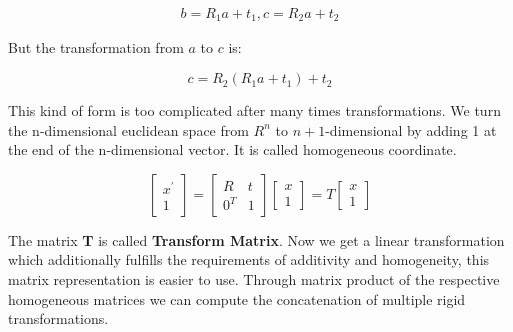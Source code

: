 \begin{align*}\label{eq:equTM2}
     b = R_1a + t_1, c = R_2a + t_2               
\end{align*}

But the transformation from $a$ to $c$ is:

\begin{equation*}
     c = R_2(R_1a + t_1) + t_2            
\end{equation*}

This kind of form is too complicated after many times transformations. We turn the n-dimensional euclidean space from $R^n$ to $n+1$-dimensional by adding 1 at the end of the n-dimensional vector. It is called homogeneous coordinate.


\begin{equation*}
     \begin{bmatrix} x^{\prime} \\ 1 \end{bmatrix}
     =
     \begin{bmatrix} R & t\\
                     0^{T} & 1 \end{bmatrix}
     \begin{bmatrix} x \\ 1 \end{bmatrix}
     = T    
     \begin{bmatrix} x \\ 1 \end{bmatrix}                        
\end{equation*}

The matrix \textbf{T} is called \textbf{Transform Matrix}. Now we get a linear transformation which additionally fulfills the requirements of additivity and homogeneity, this matrix representation is easier to use. Through matrix product of the respective homogeneous matrices we can compute the concatenation of multiple rigid transformations. 

